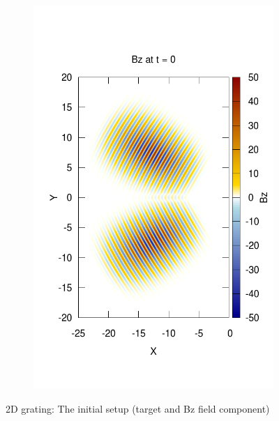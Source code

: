 \documentclass[11pt,a4paper]{report}
\begin{document}
\begin{figure}[htbp]
\begin{subfigure}[c]{0.3\textwidth}
        \end{subfigure}
                  \begin{subfigure}[c]{0.4\textwidth}
                \includegraphics[width=\textwidth]{2d_field.png}                
                
        \end{subfigure}
        \caption{2D grating: The initial setup (target and Bz field component)}
        \label{pic_2dgrt}
\end{figure}
\end{document}
